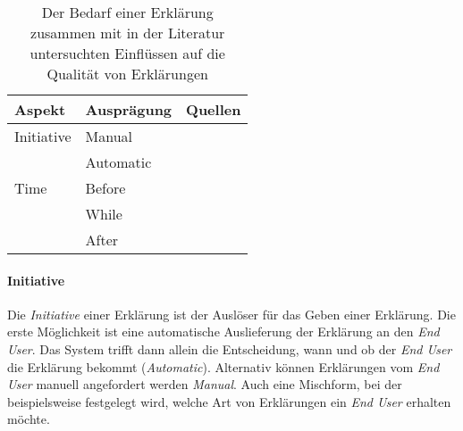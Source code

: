 \begin{table}[hbt!]
    \begin{center}
        \begin{tabular}{|p{}|p{}|p{}|}
            \hline
            \textbf{Aspekt}    & \textbf{Ausprägung}   & \textbf{Quellen} \\ \hline
            Initiative              &  Manual        & \cite{chazette_end-users_nodate} \cite{tintarev_designing_nodate} \cite{wiegand_id_2020} \\
                                    &  Automatic   & \cite{chazette_end-users_nodate} \cite{eiband_impact_2019} \cite{wiegand_id_2020} \cite{schaffer_i_2019} \cite{yamada_evaluating_2016} \\
            \hline
            Time                    &  Before               & \cite{rosenfeld_explainability_2019} \cite{wiegand_id_2020} \cite{kunkel_let_2019} \cite{koo_why_2015} \cite{haspiel_explanations_2018} \\
                                    &  While                & \cite{rosenfeld_explainability_2019} \cite{wiegand_id_2020} \cite{kunkel_let_2019} \\
                                    &  After                & \cite{rosenfeld_explainability_2019} \cite{wiegand_id_2020} \cite{kunkel_let_2019} \cite{koo_why_2015} \cite{haspiel_explanations_2018} \cite{wiegand2019drive} \\
            \hline
        \end{tabular}
    \end{center}
    \caption{Der Bedarf einer Erklärung zusammen mit in der Literatur untersuchten Einflüssen auf die Qualität von Erklärungen}
    \label{tab:explanation_demands}
\end{table}

\paragraph{Initiative} Die \textit{Initiative} einer Erklärung ist der Auslöser für das Geben einer Erklärung. Die erste Möglichkeit ist eine automatische Auslieferung der Erklärung an den \textit{End User}. Das System trifft dann allein die Entscheidung, wann und ob der \textit{End User} die Erklärung bekommt (\textit{Automatic}). Alternativ können Erklärungen vom \textit{End User} manuell angefordert werden \textit{Manual}. Auch eine Mischform, bei der beispielsweise festgelegt wird, welche Art von Erklärungen ein \textit{End User} erhalten möchte.

